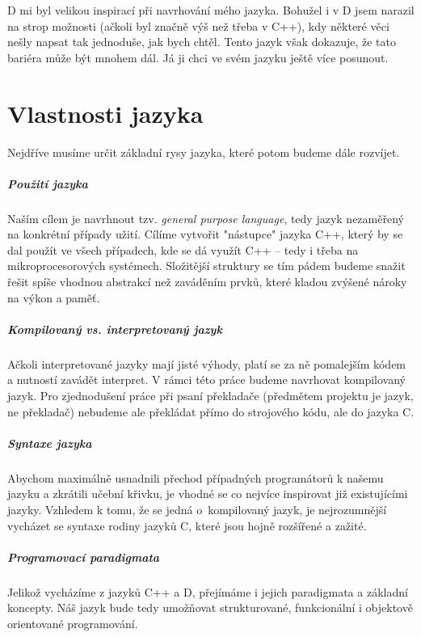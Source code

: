 D mi byl velikou inspirací při navrhování mého jazyka. Bohužel i v D jsem narazil na strop možnosti (ačkoli byl značně výš než třeba v C++), kdy některé věci nešly napsat tak jednoduše, jak bych chtěl. Tento jazyk však dokazuje, že tato bariéra může být mnohem dál. Já ji chci ve svém jazyku ještě více posunout. 

\chapter{Vlastnosti jazyka}
Nejdříve musíme určit základní rysy jazyka, které potom budeme dále rozvíjet.

\paragraph{Použití jazyka}
Naším cílem je navrhnout tzv. \textit{general purpose language}, tedy jazyk nezaměřený na konkrétní případy užití. Cílíme vytvořit "nástupce" jazyka C++, který by se dal použít ve všech případech, kde se dá využít C++ -- tedy i třeba na mikroprocesorových systémech. Složitější struktury se tím pádem budeme snažit řešit spíše vhodnou abstrakcí než zaváděním prvků, které kladou zvýšené nároky na výkon a paměť.

\paragraph{Kompilovaný vs. interpretovaný jazyk}
Ačkoli interpretované jazyky mají jisté výhody, platí se za ně pomalejším kódem a nutností zavádět interpret. V rámci této práce budeme navrhovat kompilovaný jazyk. Pro zjednodušení práce při psaní překladače (předmětem projektu je jazyk, ne překladač) nebudeme ale překládat přímo do strojového kódu, ale do jazyka C.

\paragraph{Syntaxe jazyka}
Abychom maximálně usnadnili přechod případných programátorů k našemu jazyku a zkrátili učební křivku, je vhodné se co nejvíce inspirovat již existujícími jazyky. Vzhledem k tomu, že se jedná o~kompilovaný jazyk, je nejrozumnější vycházet se syntaxe rodiny jazyků C, které jsou hojně rozšířené a zažité.

\paragraph{Programovací paradigmata}
Jelikož vycházíme z jazyků C++ a D, přejímáme i jejich paradigmata a základní koncepty. Náš jazyk bude tedy umožňovat strukturované, funkcionální i objektově orientované programování.

